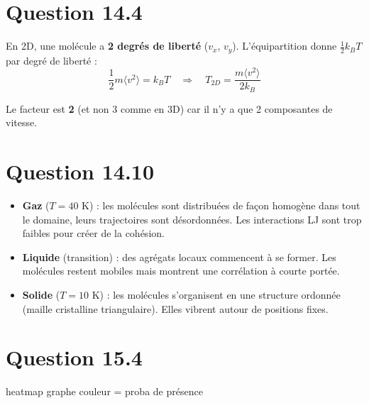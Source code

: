 \documentclass[a4paper]{article}
\begin{document}
\section*{Question 14.4}
    En 2D, une molécule a \textbf{2 degrés de liberté} ($v_x$, $v_y$). L'équipartition donne $\frac{1}{2}k_B T$ par degré de liberté :
    $$\frac{1}{2} m \langle v^2 \rangle = k_B T \quad\Rightarrow\quad T_{2D} = \frac{m \langle v^2 \rangle}{2 k_B}$$

    Le facteur est \textbf{2} (et non 3 comme en 3D) car il n'y a que 2 composantes de vitesse.

\section*{Question 14.10}
    \begin{itemize}
        \item \textbf{Gaz} ($T = 40$ K) : les molécules sont distribuées de façon homogène dans tout le domaine, leurs trajectoires sont désordonnées. Les interactions LJ sont trop faibles pour créer de la cohésion.
        \item \textbf{Liquide} (transition) : des agrégats locaux commencent à se former. Les molécules restent mobiles mais montrent une corrélation à courte portée.
        \item \textbf{Solide} ($T = 10$ K) : les molécules s'organisent en une structure ordonnée (maille cristalline triangulaire). Elles vibrent autour de positions fixes.
    \end{itemize}

\section*{Question 15.4}
    heatmap graphe
    couleur = proba de présence
\end{document}
